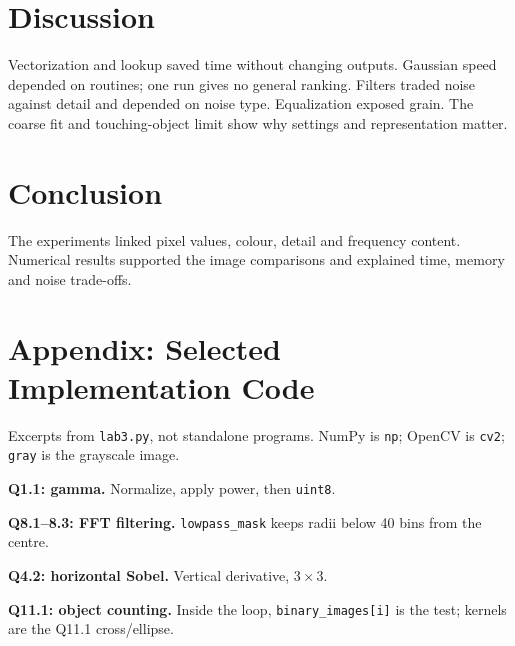 \documentclass[10pt,a4paper]{article}
\begin{document}
\section{Discussion}
Vectorization and lookup saved time without changing outputs. Gaussian speed depended on routines; one run gives no general ranking. Filters traded noise against detail and depended on noise type. Equalization exposed grain. The coarse fit and touching-object limit show why settings and representation matter.

\section{Conclusion}
The experiments linked pixel values, colour, detail and frequency content.
Numerical results supported the image comparisons and explained time, memory
and noise trade-offs.

\section*{Appendix: Selected Implementation Code}
Excerpts from \texttt{lab3.py}, not standalone programs. NumPy is \texttt{np};
OpenCV is \texttt{cv2}; \texttt{gray} is the grayscale image.

\begin{minipage}[t]{0.49\linewidth}\vspace{0pt}\raggedright
\textbf{Q1.1: gamma.} Normalize, apply power, then \texttt{uint8}.

\textbf{Q8.1--8.3: FFT filtering.} \texttt{lowpass\_mask} keeps radii below 40 bins from the centre.

\end{minipage}\hfill
\begin{minipage}[t]{0.49\linewidth}\vspace{0pt}\raggedright
\textbf{Q4.2: horizontal Sobel.} Vertical derivative, \(3\times3\).

\textbf{Q11.1: object counting.} Inside the loop, \texttt{binary\_images[i]} is the test; kernels are the Q11.1 cross/ellipse.

\end{minipage}
\end{document}
